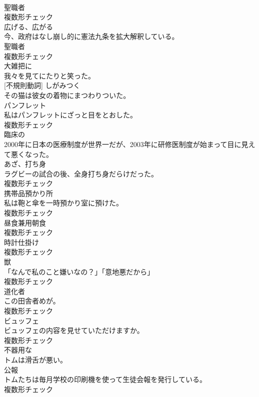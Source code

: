 \documentclass[8pt]{extreport}
\begin{document}
\begin{CJK}{UTF8}{min}
\\	[名詞]	聖職者	
\\	複数形チェック
\\	[動詞]	広げる、広がる	
\\	今、政府はなし崩し的に憲法九条を拡大解釈している。	
\\	[名詞]	聖職者	
\\	複数形チェック
\\	[副詞]	大雑把に	
\\	我々を見てにたりと笑った。	
\\	[動詞] [不規則動詞]	しがみつく	
\\	その猫は彼女の着物にまつわりついた。	
\\	[名詞]	パンフレット	
\\	私はパンフレットにざっと目をとおした。	
\\	複数形チェック
\\	[形容詞]	臨床の	
\\	2000年に日本の医療制度が世界一だが、2003年に研修医制度が始まって目に見えて悪くなった。	
\\	[名詞]	あざ、打ち身	
\\	ラグビーの試合の後、全身打ち身だらけだった。	
\\	複数形チェック
\\	[名詞]	携帯品預かり所	
\\	私は鞄と傘を一時預かり室に預けた。	
\\	複数形チェック
\\	[名詞]	昼食兼用朝食	
\\	複数形チェック
\\	[名詞]	時計仕掛け	
\\	複数形チェック
\\	[名詞]	獣	
\\	「なんで私のこと嫌いなの？」「意地悪だから」	
\\	複数形チェック
\\	[名詞]	道化者	
\\	この田舎者めが。	
\\	複数形チェック
\\	[名詞]	ビュッフェ	
\\	ビュッフェの内容を見せていただけますか。	
\\	複数形チェック
\\	[形容詞]	不器用な	
\\	トムは滑舌が悪い。	
\\	[名詞]	公報	
\\	トムたちは毎月学校の印刷機を使って生徒会報を発行している。	
\\	複数形チェック

\end{CJK}
\end{document}
